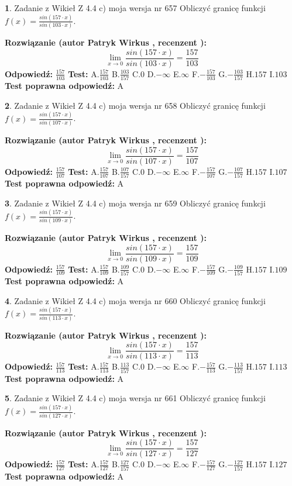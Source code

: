 \documentclass[12pt, a4paper]{article}
\theoremstyle{definition} %
\newtheorem{zad}{}
\newcommand{\zadStart}[1]{\begin{zad}#1\newline}
\newcommand{\zadStop}{\end{zad}}
\newcommand{\rozwStart}[2]{\noindent \textbf{Rozwiązanie (autor #1 , recenzent #2): }\newline}
\newcommand{\rozwStop}{\newline}
\newcommand{\odpStart}{\noindent \textbf{Odpowiedź:}\newline}
\newcommand{\odpStop}{\newline}
\newcommand{\testStart}{\noindent \textbf{Test:}\newline}
\newcommand{\testStop}{\newline}
\newcommand{\kluczStart}{\noindent \textbf{Test poprawna odpowiedź:}\newline}
\newcommand{\kluczStop}{\newline}
\begin{document}
\zadStart{Zadanie z Wikieł Z 4.4 c) moja wersja nr 657}
Obliczyć granicę funkcji $f(x)=\frac{sin(157\cdot x)}{sin(103\cdot x)}$.
\zadStop
\rozwStart{Patryk Wirkus}{}
$$\lim\limits_{x\to 0}\frac{sin(157\cdot x)}{sin(103\cdot x)}=
\frac{157}{103}$$
\rozwStop
\odpStart
$\frac{157}{103}$
\odpStop
\testStart
A.$\frac{157}{103}$
B.$\frac{103}{157}$
C.$0$
D.$-\infty$
E.$\infty$
F.$-\frac{157}{103}$
G.$-\frac{103}{157}$
H.$157$
I.$103$
\testStop
\kluczStart
A
\kluczStop



\zadStart{Zadanie z Wikieł Z 4.4 c) moja wersja nr 658}
Obliczyć granicę funkcji $f(x)=\frac{sin(157\cdot x)}{sin(107\cdot x)}$.
\zadStop
\rozwStart{Patryk Wirkus}{}
$$\lim\limits_{x\to 0}\frac{sin(157\cdot x)}{sin(107\cdot x)}=
\frac{157}{107}$$
\rozwStop
\odpStart
$\frac{157}{107}$
\odpStop
\testStart
A.$\frac{157}{107}$
B.$\frac{107}{157}$
C.$0$
D.$-\infty$
E.$\infty$
F.$-\frac{157}{107}$
G.$-\frac{107}{157}$
H.$157$
I.$107$
\testStop
\kluczStart
A
\kluczStop



\zadStart{Zadanie z Wikieł Z 4.4 c) moja wersja nr 659}
Obliczyć granicę funkcji $f(x)=\frac{sin(157\cdot x)}{sin(109\cdot x)}$.
\zadStop
\rozwStart{Patryk Wirkus}{}
$$\lim\limits_{x\to 0}\frac{sin(157\cdot x)}{sin(109\cdot x)}=
\frac{157}{109}$$
\rozwStop
\odpStart
$\frac{157}{109}$
\odpStop
\testStart
A.$\frac{157}{109}$
B.$\frac{109}{157}$
C.$0$
D.$-\infty$
E.$\infty$
F.$-\frac{157}{109}$
G.$-\frac{109}{157}$
H.$157$
I.$109$
\testStop
\kluczStart
A
\kluczStop



\zadStart{Zadanie z Wikieł Z 4.4 c) moja wersja nr 660}
Obliczyć granicę funkcji $f(x)=\frac{sin(157\cdot x)}{sin(113\cdot x)}$.
\zadStop
\rozwStart{Patryk Wirkus}{}
$$\lim\limits_{x\to 0}\frac{sin(157\cdot x)}{sin(113\cdot x)}=
\frac{157}{113}$$
\rozwStop
\odpStart
$\frac{157}{113}$
\odpStop
\testStart
A.$\frac{157}{113}$
B.$\frac{113}{157}$
C.$0$
D.$-\infty$
E.$\infty$
F.$-\frac{157}{113}$
G.$-\frac{113}{157}$
H.$157$
I.$113$
\testStop
\kluczStart
A
\kluczStop



\zadStart{Zadanie z Wikieł Z 4.4 c) moja wersja nr 661}
Obliczyć granicę funkcji $f(x)=\frac{sin(157\cdot x)}{sin(127\cdot x)}$.
\zadStop
\rozwStart{Patryk Wirkus}{}
$$\lim\limits_{x\to 0}\frac{sin(157\cdot x)}{sin(127\cdot x)}=
\frac{157}{127}$$
\rozwStop
\odpStart
$\frac{157}{127}$
\odpStop
\testStart
A.$\frac{157}{127}$
B.$\frac{127}{157}$
C.$0$
D.$-\infty$
E.$\infty$
F.$-\frac{157}{127}$
G.$-\frac{127}{157}$
H.$157$
I.$127$
\testStop
\kluczStart
A
\kluczStop
\end{document}
